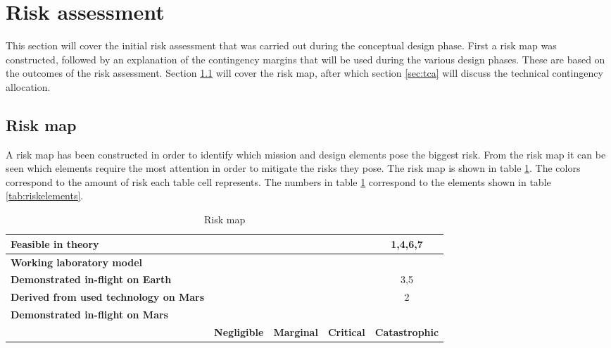 \section{Risk assessment} 
\label{ch:risk}
This section will cover the initial risk assessment that was carried out during the conceptual design phase. First a risk map was constructed, followed by an explanation of the contingency margins that will be used during the various design phases. These are based on the outcomes of the risk assessment. Section \ref{sec:riskmap} will cover the risk map, after which section \ref{sec:tca} will discuss the technical contingency allocation.

\subsection{Risk map}
\label{sec:riskmap}
 A risk map has been constructed in order to identify which mission and design elements pose the biggest risk. From the risk map it can be seen which elements require the most attention in order to mitigate the risks they pose. The risk map is shown in table \ref{tab:riskmap}. The colors correspond to the amount of risk each table cell represents. The numbers in table \ref{tab:riskmap} correspond to the elements shown in table \ref{tab:riskelements}.

\begin{table}[h]
\centering
\caption{Risk map}
\label{tab:riskmap}
    \begin{tabular}{|p{6.5cm}|c|c|c|c|}
    \hline
    \textbf{Feasible in theory} & \cellcolor{green} & \cellcolor{yellow} & \cellcolor{red} & \cellcolor{red} 1,4,6,7 \\ \hline
    \textbf{Working laboratory model} & \cellcolor{green} & \cellcolor{yellow} & \cellcolor{red} & \cellcolor{red} \\ \hline
    \textbf{Demonstrated in-flight on Earth} & \cellcolor{green} & \cellcolor{yellow} & \cellcolor{yellow} & \cellcolor{yellow} 3,5 \\ \hline
    \textbf{Derived from used technology on Mars} & \cellcolor{green} & \cellcolor{yellow} & \cellcolor{yellow} & \cellcolor{yellow} 2 \\ \hline
    \textbf{Demonstrated in-flight on Mars} & \cellcolor{green} & \cellcolor{green} & \cellcolor{green} & \cellcolor{green} \\ \hline
     & \textbf{Negligible} & \textbf{Marginal} & \textbf{Critical} & \textbf{Catastrophic} \\ \hline
    \end{tabular}
\end{table}

